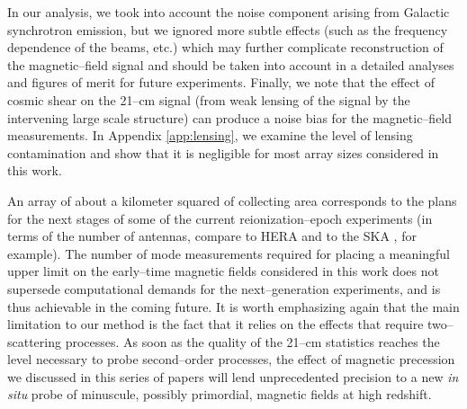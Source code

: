 In our analysis, we took into account the noise component arising from Galactic synchrotron emission, but we ignored more subtle effects (such as the frequency dependence of the beams, etc.) which may further complicate reconstruction of the magnetic--field signal and should be taken into account in a detailed analyses and figures of merit for future experiments.
Finally, we note that the effect of cosmic shear on the 21--cm signal (from weak lensing of the signal by the intervening large scale structure) can produce a noise bias for the magnetic--field measurements. In Appendix \ref{app:lensing}, we examine the level of lensing contamination and show that it is negligible for most array sizes considered in this work. 

An array of about a kilometer squared of collecting area corresponds to the plans for the next stages of some of the current reionization--epoch experiments (in terms of the number of antennas, compare to HERA and to the SKA \cite{2008arXiv0802.1727C}, for example). The number of mode measurements required for placing a meaningful upper limit on the early--time magnetic fields considered in this work does not supersede computational demands for the next--generation  experiments, and is thus achievable in the coming future. It is worth emphasizing again that the main limitation to our method is the fact that it relies on the effects that require two--scattering processes. As soon as the quality of the 21--cm statistics reaches the level necessary to probe second--order processes, the effect of magnetic precession we discussed in this series of papers will lend unprecedented precision to a new \textit{in situ} probe of minuscule, possibly primordial, magnetic fields at high redshift. 

  